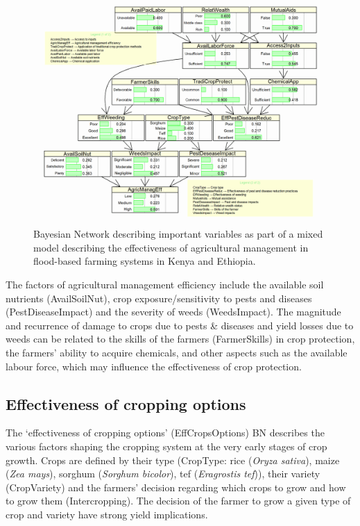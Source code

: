 \documentclass[]{elsarticle} %
\begin{document}
\begin{figure}[!h]

{\centering \includegraphics[width=1\linewidth,]{figures/figure_s5} 

}

\caption{Bayesian Network describing important variables as part of a mixed model describing the effectiveness of agricultural management in flood-based farming systems in Kenya and Ethiopia.}\label{fig:fig5}
\end{figure}

The factors of agricultural management efficiency include the available soil nutrients (AvailSoilNut), crop exposure/sensitivity to pests and diseases (PestDiseaseImpact) and the severity of weeds (WeedsImpact). The magnitude and recurrence of damage to crops due to pests \& diseases and yield losses due to weeds can be related to the skills of the farmers (FarmerSkills) in crop protection, the farmers' ability to acquire chemicals, and other aspects such as the available labour force, which may influence the effectiveness of crop protection.

\hypertarget{refs14}{%
\subsection{Effectiveness of cropping options}\label{refs14}}

The `effectiveness of cropping options' (EffCropsOptions) BN describes the various factors shaping the cropping system at the very early stages of crop growth. Crops are defined by their type (CropType: rice (\emph{Oryza sativa}), maize (\emph{Zea mays}), sorghum (\emph{Sorghum bicolor}), tef (\emph{Eragrostis tef})), their variety (CropVariety) and the farmers' decision regarding which crops to grow and how to grow them (Intercropping). The decision of the farmer to grow a given type of crop and variety have strong yield implications.
\end{document}
